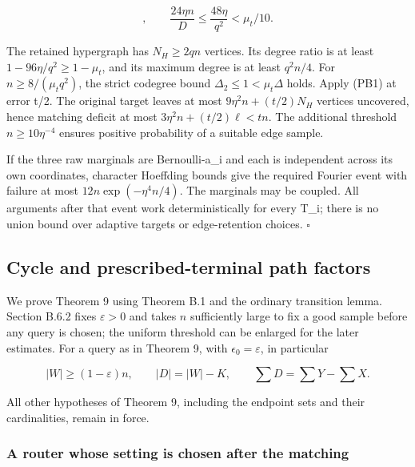 \documentclass[11pt,a4paper]{article}
\begin{document}
\begin{equation}
[D-24\eta n,D+24\eta n],\qquad
\frac{24\eta n}{D}\le\frac{48\eta}{q^2}<\mu_t/10.
\tag{J6}\label{eq:J6}
\end{equation}

The retained hypergraph has \(N_H\ge 2qn\) vertices. Its degree ratio is at least \(1-96\eta/q^2\ge 1-\mu_t\), and its maximum degree is at least \(q^2n/4\). For \(n\ge 8/(\mu_t q^2)\), the strict codegree bound \(\Delta_2\le 1<\mu_t \Delta\) holds. Apply (PB1) at error t/2. The original target leaves at most \(9\eta^2 n+(t/2)N_H\) vertices uncovered, hence matching deficit at most \(3\eta^2 n+(t/2)\ell<tn\). The additional threshold \(n\ge 10\eta^{-4}\) ensures positive probability of a suitable edge sample.

If the three raw marginals are Bernoulli-a\_i and each is independent across its own coordinates, character Hoeffding bounds give the required Fourier event with failure at most \(12n \exp(-\eta^4 n/4)\). The marginals may be coupled. All arguments after that event work deterministically for every T\_i; there is no union bound over adaptive targets or edge-retention choices. \(\square\)

\hypertarget{cycle-and-prescribed-terminal-path-factors}{%
\subsection{Cycle and prescribed-terminal path factors}\label{cycle-and-prescribed-terminal-path-factors}}

We prove Theorem 9 using Theorem B.1 and the ordinary transition lemma. Section B.6.2 fixes \(\varepsilon>0\) and takes \(n\) sufficiently large to fix a good sample before any query is chosen; the uniform threshold can be enlarged for the later estimates. For a query as in Theorem 9, with \(\epsilon_0=\varepsilon\), in particular

\begin{equation}
|W|\ge(1-\varepsilon)n,\qquad
|D|=|W|-K,\qquad
\sum D=\sum Y-\sum X.
\tag{PF1}\label{eq:PF1}
\end{equation}

All other hypotheses of Theorem 9, including the endpoint sets and their cardinalities, remain in force.

\hypertarget{a-router-whose-setting-is-chosen-after-the-matching}{%
\subsubsection{A router whose setting is chosen after the matching}\label{a-router-whose-setting-is-chosen-after-the-matching}}
\end{document}
